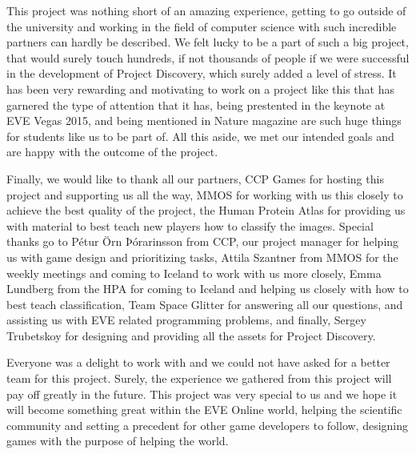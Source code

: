 This project was nothing short of an amazing experience, getting to go outside of the university and working in the field of computer science with such incredible partners can hardly be described. We felt lucky to be a part of such a big project, that would surely touch hundreds, if not thousands of people if we were successful in the development of Project Discovery, which surely added a level of stress. It has been very rewarding and motivating to work on a project like this that has garnered the type of attention that it has, being prestented in the keynote at EVE Vegas 2015, and being mentioned in Nature magazine are such huge things for students like us to be part of. All this aside, we met our intended goals and are happy with the outcome of the project. 

Finally, we would like to thank all our partners, CCP Games for hosting this project and supporting us all the way, MMOS for working with us this closely to achieve the best quality of the project, the Human Protein Atlas for providing us with material to best teach new players how to classify the images. Special thanks go to Pétur Örn Þórarinsson from CCP, our project manager for helping us with game design and prioritizing tasks, Attila Szantner from MMOS for the weekly meetings and coming to Iceland to work with us more closely, Emma Lundberg from the HPA for coming to Iceland and helping us closely with how to best teach classification, Team Space Glitter for answering all our questions, and assisting us with EVE related programming problems, and finally, Sergey Trubetskoy for designing and providing all the assets for Project Discovery.

Everyone was a delight to work with and we could not have asked for a better team for this project. Surely, the experience we gathered from this project will pay off greatly in the future. This project was very special to us and we hope it will become something great within the EVE Online world, helping the scientific community and setting a precedent for other game developers to follow, designing games with the purpose of helping the world.